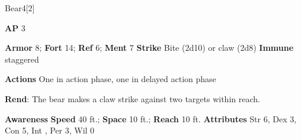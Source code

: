 \begin{monsection}[Brown]{Bear}{4}[2]
\vspace{-1em}\vspace{-1em}
\begin{spellcontent}
\begin{spelltargetinginfo}
{\textbf{AP} 3}

\pari \textbf{Armor} 8;
\textbf{Fort} 14;
\textbf{Ref} 6;
\textbf{Ment} 7
\pari \textbf{Strike} Bite  (2d10) or claw  (2d8)
\pari \textbf{Immune} staggered

\pari \textbf{Actions} One in action phase, one in delayed action phase
\end{spelltargetinginfo}


\begin{spelleffects}

\pari
\textbf{Rend}:
The bear makes a claw strike against two targets within reach.



\end{spelleffects}

\end{spellcontent}

\begin{monsterfooter}
\pari \textbf{Awareness} 
\pari \textbf{Speed} 40 ft.;
\textbf{Space} 10 ft.;
\textbf{Reach} 10 ft.
\pari \textbf{Attributes}
Str 6,
Dex 3,
Con 5,
Int ,
Per 3,
Wil 0
\end{monsterfooter}
\end{monsection}



